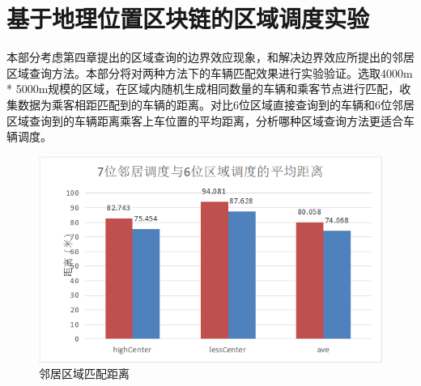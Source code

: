\section{基于地理位置区块链的区域调度实验}

本部分考虑第四章提出的区域查询的边界效应现象，和解决边界效应所提出的邻居区域查询方法。本部分将对两种方法下的车辆匹配效果进行实验验证。选取4000m * 5000m规模的区域，在区域内随机生成相同数量的车辆和乘客节点进行匹配，收集数据为乘客相距匹配到的车辆的距离。对比6位区域直接查询到的车辆和6位邻居区域查询到的车辆距离乘客上车位置的平均距离，分析哪种区域查询方法更适合车辆调度。

\begin{figure}
  \centering
  \includegraphics[width=1.0\textwidth]{figures/邻居区域匹配距离}
  \caption{邻居区域匹配距离}\label{fig:regionDistance}
\end{figure}





